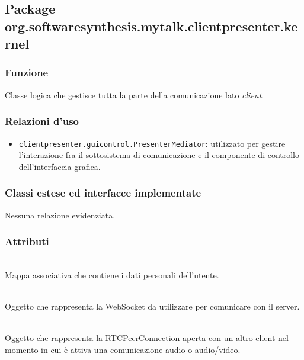 \subsection{Package org.softwaresynthesis.mytalk.clientpresenter.kernel}\label{sec:kernel}

\subsubsection*{Funzione}
Classe logica che gestisce tutta la parte della comunicazione lato \textit{client}.

\subsubsection*{Relazioni d'uso}
\begin{itemize}
  \item \texttt{clientpresenter.guicontrol.PresenterMediator}: utilizzato per gestire l'interazione fra il sottosistema di comunicazione e il componente di controllo dell'interfaccia grafica.
\end{itemize}

\subsubsection*{Classi estese ed interfacce implementate}
Nessuna relazione evidenziata.

\subsubsection*{Attributi}
\begin{description}
  \item{}\\
  Mappa associativa  che contiene i dati personali dell'utente.

  \item{}\\
  Oggetto che rappresenta la WebSocket da utilizzare per comunicare con il server.

  \item{}\\
  Oggetto che rappresenta la RTCPeerConnection aperta con un altro client nel momento in cui è attiva una comunicazione audio o audio/video.

\end{description}

